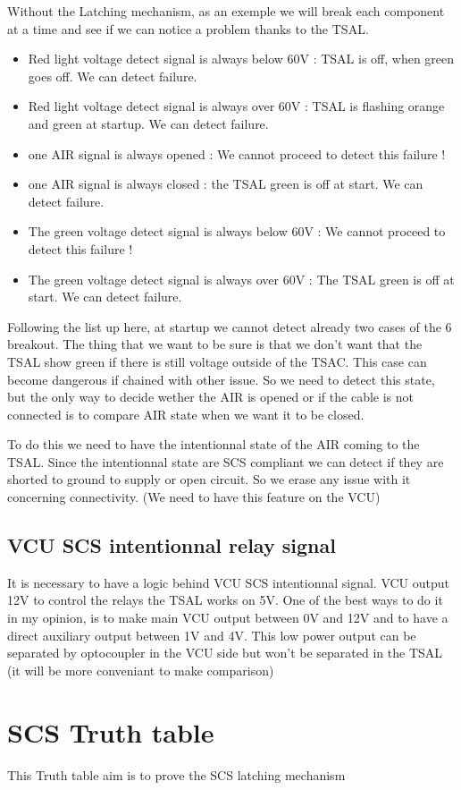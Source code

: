 \documentclass{EPSA-rap-template}
\begin{document}
Without the Latching mechanism, as an exemple we will break each component at a time and see if we can notice a problem thanks to the TSAL.

\begin{itemize}
\item Red light voltage detect signal is always below 60V : TSAL is off, when green goes off. We can detect failure.
\item Red light voltage detect signal is always over 60V : TSAL is flashing orange and green at startup. We can detect failure.
\item one AIR signal is always opened : We cannot proceed to detect this failure !
\item one AIR signal is always closed : the TSAL green is off at start. We can detect failure.
\item The green voltage detect signal is always below 60V : We cannot proceed to detect this failure !
\item The green voltage detect signal is always over 60V : The TSAL green is off at start. We can detect failure.
\end{itemize}

Following the list up here, at startup we cannot detect already two cases of the 6 breakout. The thing that we want to be sure is that we don't want that the TSAL show green if there is still voltage outside of the TSAC. This case can become dangerous if chained with other issue. So we need to detect this state, but the only way to decide wether the AIR is opened or if the cable is not connected is to compare AIR state when we want it to be closed.

To do this we need to have the intentionnal state of the AIR coming to the TSAL. Since the intentionnal state are SCS compliant we can detect if they are shorted to ground to supply or open circuit. So we erase any issue with it concerning connectivity. (We need to have this feature on the VCU)

\subsection{VCU SCS intentionnal relay signal}

It is necessary to have a logic behind VCU SCS intentionnal signal. VCU output 12V to control the relays the TSAL works on 5V. One of the best ways to do it in my opinion, is to make main VCU output between 0V and 12V and to have a direct auxiliary output between 1V and 4V. This low power output can be separated by optocoupler in the VCU side but won't be separated in the TSAL (it will be more conveniant to make comparison)

\section{SCS Truth table}

This Truth table aim is to prove the SCS latching mechanism
\end{document}
